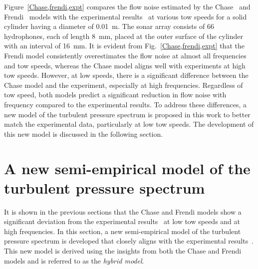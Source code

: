 \documentclass[11pt,cleanfoot]{asme2ej}
\begin{document}
Figure~\ref{Chase,frendi,expt} compares the flow noise estimated by the Chase~\cite{Chase1981} and Frendi~\cite{frendi2020} models with the experimental results~\cite{Unni2011} at various tow speeds for a solid cylinder having a diameter of 0.01~m. The sonar array consists of 66 hydrophones, each of length 8~mm, placed at the outer surface of the cylinder with an interval of 16~mm. It is evident from Fig.~\ref{Chase,frendi,expt} that the Frendi model consistently overestimates the flow noise at almost all frequencies and tow speeds, whereas the Chase model aligns well with experiments at high tow speeds. However, at low speeds, there is a significant difference between the Chase model and the experiment, especially at high frequencies. Regardless of tow speed, both models predict a significant reduction in flow noise with frequency compared to the experimental results. To address these differences, a new model of the turbulent pressure spectrum is proposed in this work to better match the experimental data, particularly at low tow speeds. The development of this new model is discussed in the following section.
\section{A new semi-empirical model of the turbulent pressure spectrum}\label{sec:hybmodel}
It is shown in the previous sections that the Chase and Frendi models show a significant deviation from the experimental results~\cite{Unni2011} at low tow speeds and at high frequencies. In this section, a new semi-empirical model of the turbulent pressure spectrum is developed that closely aligns with the experimental results~\cite{Unni2011}. This new model is derived using the insights from both the Chase and Frendi models and is referred to as the \textit{hybrid model}.
\end{document}
